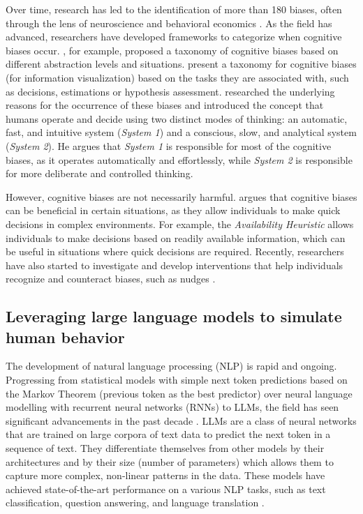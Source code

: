 \par Over time, research has led to the identification of more than 180 biases, often through the lens of neuroscience and behavioral economics \parencite{azzopardi2021cognitive}. As the field has advanced, researchers have developed frameworks to categorize when cognitive biases occur. \textcite{arnott1998taxonomy}, for example, proposed a taxonomy of cognitive biases based on different abstraction levels and situations. \textcite{dimara2018task} present a taxonomy for cognitive biases (for information visualization) based on the tasks they are associated with, such as decisions, estimations or hypothesis assessment. \textcite{kahneman2017thinking} researched the underlying reasons for the occurrence of these biases and introduced the concept that humans operate and decide using two distinct modes of thinking: an automatic, fast, and intuitive system (\textit{System 1}) and a conscious, slow, and analytical system (\textit{System 2}). He argues that \textit{System 1} is responsible for most of the cognitive biases, as it operates automatically and effortlessly, while \textit{System 2} is responsible for more deliberate and controlled thinking.

\par However, cognitive biases are not necessarily harmful. \textcite{gigerenzer2007gut} argues that cognitive biases can be beneficial in certain situations, as they allow individuals to make quick decisions in complex environments. For example, the \textit{Availability Heuristic} allows individuals to make decisions based on readily available information, which can be useful in situations where quick decisions are required. Recently, researchers have also started to investigate and develop interventions that help individuals recognize and counteract biases, such as nudges \parencite{thaler2008nudge}.


\subsection{Leveraging large language models to simulate human behavior}
\par The development of natural language processing (NLP) is rapid and ongoing. Progressing from statistical models with simple next token predictions based on the Markov Theorem (previous token as the best predictor) over neural language modelling with recurrent neural networks (RNNs) to LLMs, the field has seen significant advancements in the past decade \parencite{zhao2023survey}. LLMs are a class of neural networks that are trained on large corpora of text data to predict the next token in a sequence of text. They differentiate themselves from other models by their architectures and by their size (number of parameters) which allows them to capture more complex, non-linear patterns in the data. These models have achieved state-of-the-art performance on a various NLP tasks, such as text classification, question answering, and language translation \parencite{naveed2023comprehensive, zhao2023survey}.

